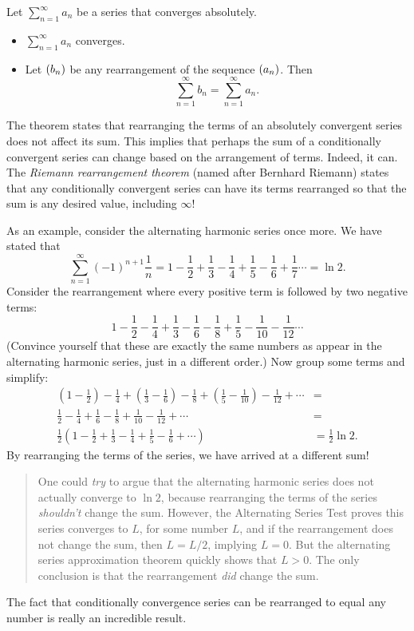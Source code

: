 \documentclass{ximera}
\begin{document}
\begin{theorem}
  Let $\sum_{n=1}^\infty a_n$ be a series that converges absolutely.
\begin{itemize}
\item $\sum_{n=1}^\infty a_n$ converges.  
\item Let $\left( b_n \right)$ be any rearrangement of the sequence
  $\left( a_n \right)$. Then
	  \[
          \sum_{n=1}^\infty b_n = \sum_{n=1}^\infty a_n.
          \]
\end{itemize}
\end{theorem}

The theorem states that rearranging the terms of an absolutely
convergent series does not affect its sum. This implies that perhaps
the sum of a conditionally convergent series can change based on the
arrangement of terms. Indeed, it can. The \textit{Riemann
  rearrangement theorem} (named after Bernhard Riemann) states that
any conditionally convergent series can have its terms rearranged so
that the sum is any desired value, including $\infty$!


As an example, consider the alternating harmonic series once more. We
have stated that
\[
\sum_{n=1}^\infty (-1)^{n+1}\frac1n =1-\frac12+\frac13-\frac14+\frac15-\frac16+\frac17\cdots = \ln 2.
\]
Consider the rearrangement where every positive term is followed by two negative terms:
\[
1-\frac12-\frac14+\frac13-\frac16-\frac18+\frac15-\frac1{10}-\frac1{12}\cdots
\]
(Convince yourself that these are exactly the same numbers as appear
in the alternating harmonic series, just in a different order.) Now
group some terms and simplify:
\begin{align*}
\left(1-\frac12\right)-\frac14+\left(\frac13-\frac16\right)-\frac18+\left(\frac15-\frac1{10}\right)-\frac1{12}+\cdots &= \\
\frac12-\frac14+\frac16-\frac18+\frac1{10}-\frac{1}{12}+\cdots &= \\
\frac12\left(1-\frac12+\frac13-\frac14+\frac15-\frac16+\cdots\right) & = \frac12\ln 2.
\end{align*}
By rearranging the terms of the series, we have arrived at a different
sum!
\begin{quote}
  One could \textit{try} to argue that the alternating harmonic series
  does not actually converge to $\ln 2$, because rearranging the terms
  of the series \textit{shouldn't} change the sum. However, the
  Alternating Series Test proves this series converges to $L$, for
  some number $L$, and if the rearrangement does not change the sum,
  then $L = L/2$, implying $L=0$. But the alternating series
  approximation theorem quickly shows that $L>0$. The only conclusion
  is that the rearrangement \textit{did} change the sum.
\end{quote}
The fact that conditionally convergence series can be rearranged to
equal any number is really an incredible result.
\end{document}
